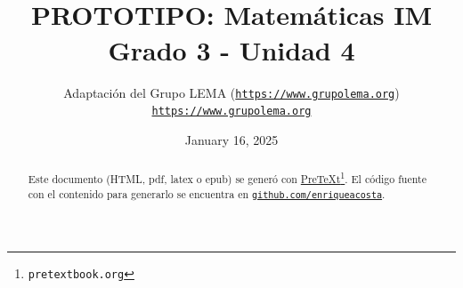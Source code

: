 
\title{PROTOTIPO: Matemáticas IM\textsuperscript{\textregistered}\\
{\large Grado 3 - Unidad 4}}
\author{Adaptación del Grupo LEMA (\href{https://www.grupolema.org}{\nolinkurl{https://www.grupolema.org}})\\
\href{https://www.grupolema.org}{\nolinkurl{https://www.grupolema.org}}
}
\date{January 16, 2025}

\usepackage{comment}


\raggedbottom
\label{gra3-uni4}\hypertarget{gra3-uni4}{}
\maketitle
\thispagestyle{empty}
\renewcommand*{\abstractname}{}
\begin{abstract}
Este documento (HTML, pdf, latex o epub) se generó con \href{https://pretextbook.org}{PreTeXt}\footnote{\nolinkurl{pretextbook.org}\label{meta-source-2-2}}. El código fuente con el contenido para generarlo se encuentra en \href{https://github.com/enriqueacosta/IllustrativeMath-GrupoLEMA}{\nolinkurl{github.com/enriqueacosta}}.%
\end{abstract}
\cleardoublepage
\renewcommand*{\abstractname}{Licencia}
